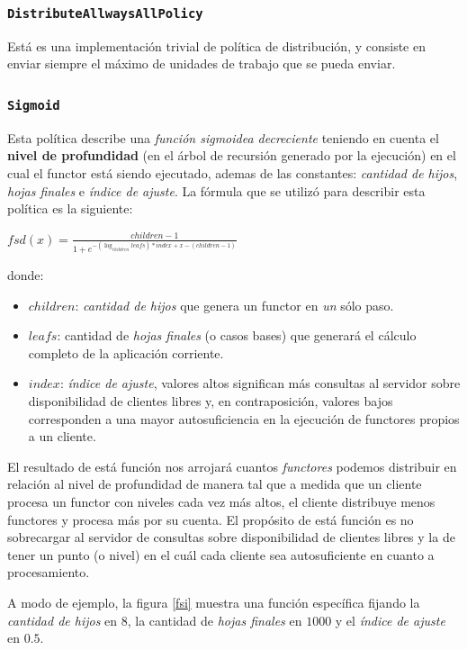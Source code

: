 \subsubsection{\texttt{DistributeAllwaysAllPolicy}}

Está es una implementación trivial de política de distribución, y consiste en enviar siempre el máximo de unidades de trabajo que se
pueda enviar.

\subsubsection{\texttt{Sigmoid}}

Esta política describe una \textit{función sigmoidea decreciente} teniendo en cuenta el \textbf{nivel de profundidad} (en el árbol de
recursión generado por la ejecución) en el cual el functor está siendo ejecutado, ademas de las constantes: \textit{cantidad de hijos},
\textit{hojas finales} e \textit{índice de ajuste}. La fórmula que se utilizó para describir esta política es la siguiente:

\begin{center}
    \Large{$fsd(x) = \frac{children-1}{1 + e^{-(\log_{children}{leafs}) * index + x - (children-1)}} $}
\end{center}
donde:
\begin{itemize}
    \item   $children$: \textit{cantidad de hijos} que genera un functor en \textit{un} sólo paso.
    \item   $leafs$: cantidad de \textit{hojas finales} (o casos bases) que generará el cálculo completo de la aplicación corriente.
    \item   $index$: \textit{índice de ajuste}, valores altos significan más consultas al servidor sobre disponibilidad de clientes libres
            y, en contraposición, valores bajos corresponden a una mayor autosuficiencia en la ejecución de functores propios a un cliente.
\end{itemize}

El resultado de está función nos arrojará cuantos \textit{functores} podemos distribuir en relación al nivel de profundidad de manera tal
que a medida que un cliente procesa un functor con niveles cada vez más altos, el cliente distribuye menos functores y procesa más por su
cuenta. El propósito de está función es no sobrecargar al servidor de consultas sobre disponibilidad de clientes libres y la de tener un
punto (o nivel) en el cuál cada cliente sea autosuficiente en cuanto a procesamiento.

A modo de ejemplo, la figura \ref{fsi} muestra una función específica fijando la \textit{cantidad de hijos} en $8$, la cantidad de
\textit{hojas finales} en $1000$ y el \textit{índice de ajuste} en $0.5$.


